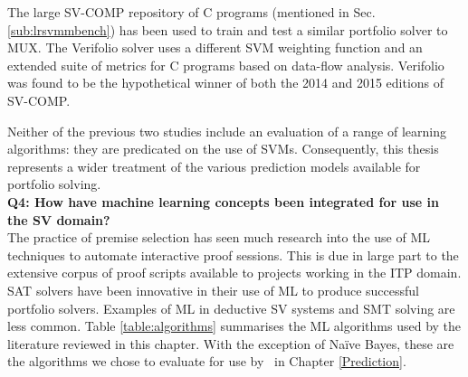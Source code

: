 The large SV-COMP repository of C programs (mentioned in Sec. \ref{sub:lrsvmmbench}) has been used to train and test a similar portfolio solver to MUX. The Verifolio \cite{DPVZ15:CAV} solver uses a different SVM weighting function and an extended suite of metrics for C programs based on data-flow analysis. Verifolio was found to be the hypothetical winner of both the 2014 and 2015 editions of SV-COMP. 

Neither of the previous two studies include an evaluation of a range of learning algorithms: they are predicated on the use of SVMs. Consequently, this thesis represents a wider treatment of the various prediction models available for portfolio solving. \\

\textbf{Q4: How have machine learning concepts been integrated for use in the SV domain?} \\
The practice of premise selection has seen much research into the use of ML techniques to automate interactive proof sessions.
This is due in large part to the extensive corpus of proof scripts available to projects working in the ITP domain.
SAT solvers have been innovative in their use of ML to produce successful portfolio solvers.
Examples of ML in deductive SV systems and SMT solving are less common. 
Table \ref{table:algorithms} summarises the ML algorithms used by the literature reviewed in this chapter. With the exception of Na{\"i}ve Bayes, these are the algorithms we chose to evaluate for use by \where~in Chapter \ref{Prediction}.

